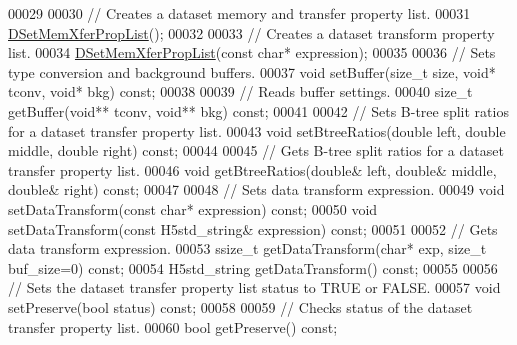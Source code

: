 \begin{DoxyCode}
00029 
00030         \textcolor{comment}{// Creates a dataset memory and transfer property list.}
00031         \hyperlink{class_h5_1_1_d_set_mem_xfer_prop_list}{DSetMemXferPropList}();
00032 
00033         \textcolor{comment}{// Creates a dataset transform property list.}
00034         \hyperlink{class_h5_1_1_d_set_mem_xfer_prop_list}{DSetMemXferPropList}(\textcolor{keyword}{const} \textcolor{keywordtype}{char}* expression);
00035 
00036         \textcolor{comment}{// Sets type conversion and background buffers.}
00037         \textcolor{keywordtype}{void} setBuffer(\textcolor{keywordtype}{size\_t} size, \textcolor{keywordtype}{void}* tconv, \textcolor{keywordtype}{void}* bkg) \textcolor{keyword}{const};
00038 
00039         \textcolor{comment}{// Reads buffer settings.}
00040         \textcolor{keywordtype}{size\_t} getBuffer(\textcolor{keywordtype}{void}** tconv, \textcolor{keywordtype}{void}** bkg) \textcolor{keyword}{const};
00041 
00042         \textcolor{comment}{// Sets B-tree split ratios for a dataset transfer property list.}
00043         \textcolor{keywordtype}{void} setBtreeRatios(\textcolor{keywordtype}{double} left, \textcolor{keywordtype}{double} middle, \textcolor{keywordtype}{double} right) \textcolor{keyword}{const};
00044 
00045         \textcolor{comment}{// Gets B-tree split ratios for a dataset transfer property list.}
00046         \textcolor{keywordtype}{void} getBtreeRatios(\textcolor{keywordtype}{double}& left, \textcolor{keywordtype}{double}& middle, \textcolor{keywordtype}{double}& right) \textcolor{keyword}{const};
00047 
00048         \textcolor{comment}{// Sets data transform expression.}
00049         \textcolor{keywordtype}{void} setDataTransform(\textcolor{keyword}{const} \textcolor{keywordtype}{char}* expression) \textcolor{keyword}{const};
00050         \textcolor{keywordtype}{void} setDataTransform(\textcolor{keyword}{const} H5std\_string& expression) \textcolor{keyword}{const};
00051 
00052         \textcolor{comment}{// Gets data transform expression.}
00053         ssize\_t getDataTransform(\textcolor{keywordtype}{char}* exp, \textcolor{keywordtype}{size\_t} buf\_size=0) \textcolor{keyword}{const};
00054         H5std\_string getDataTransform() \textcolor{keyword}{const};
00055 
00056         \textcolor{comment}{// Sets the dataset transfer property list status to TRUE or FALSE.}
00057         \textcolor{keywordtype}{void} setPreserve(\textcolor{keywordtype}{bool} status) \textcolor{keyword}{const};
00058 
00059         \textcolor{comment}{// Checks status of the dataset transfer property list.}
00060         \textcolor{keywordtype}{bool} getPreserve() \textcolor{keyword}{const};

\end{DoxyCode}
